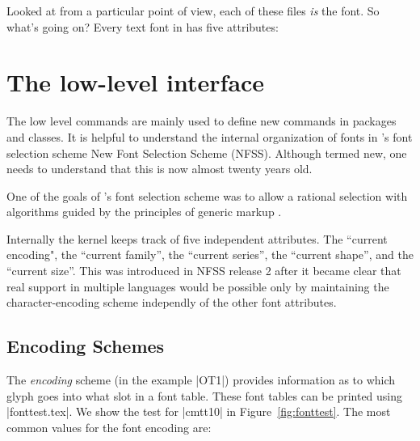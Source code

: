 Looked at from a particular point of view, each of these files \textit{is} the font. So
what’s going on? Every text font in \latex has five attributes:




\section{The low-level interface}

The low level commands are mainly  used to define new commands in packages and classes.
It is helpful to understand the internal organization of fonts in \latex's font selection
scheme New Font Selection Scheme (NFSS). Although termed new, one needs to understand
that this is now almost twenty years old.

One of the goals of \latex's font selection scheme was to allow a rational selection with
algorithms guided by the principles of generic markup \citep{companion}. 

Internally the \latex kernel keeps track of five independent attributes. The ``current encoding",
the ``current family'', the ``current series'', the ``current shape'', and the ``current size''. This was introduced in NFSS release 2 after it became clear that real support in multiple languages would be possible only by maintaining the character-encoding scheme independly of the
other font attributes.


\subsection{Encoding Schemes}

The \textit{encoding} scheme (in the example |OT1|) provides information as to which glyph goes into what slot in a font table. These font tables can be printed using |fonttest.tex|. We show the test for |cmtt10| in Figure~\ref{fig:fonttest}. The
most common values for the font encoding are:
\medskip

